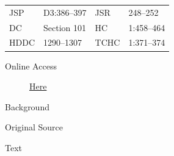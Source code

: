 				\begin{tabular}{p{0.5in}p{1in}p{0.5in}p{1in}}
				JSP	 	& D3:386--397		& JSR 		& 248--252 \\
				DC	 	& Section 101 		& HC 		& 1:458--464 \\
				HDDC 	& 1290--1307		& TCHC 		& 1:371--374 \\
				\end{tabular}
			
			\begin{description}
				\item[Online Access] \href{https://www.josephsmithpapers.org/paper-summary/revelation-16-17-december-1833-dc-101/1}{Here}
			\end{description}
			
			\begin{description}
				\item[Background]
			\end{description}
			
			
			\begin{description}
				\item[Original Source]
			\end{description}
			
			
			\begin{description}
				\item[Text]
			\end{description}
			
